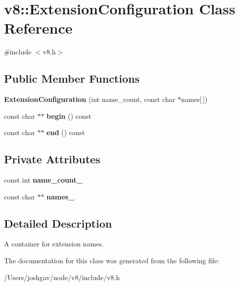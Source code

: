 \hypertarget{classv8_1_1_extension_configuration}{}\section{v8\+:\+:Extension\+Configuration Class Reference}
\label{classv8_1_1_extension_configuration}


{\ttfamily \#include $<$v8.\+h$>$}

\subsection*{Public Member Functions}
\begin{DoxyCompactItemize}
\item 
{\bfseries Extension\+Configuration} (int name\+\_\+count, const char $\ast$names\mbox{[}$\,$\mbox{]})\hypertarget{classv8_1_1_extension_configuration_a1189e46efe963db4aa7340cc767f276a}{}\label{classv8_1_1_extension_configuration_a1189e46efe963db4aa7340cc767f276a}

\item 
const char $\ast$$\ast$ {\bfseries begin} () const \hypertarget{classv8_1_1_extension_configuration_ae776fbc067a257bac854d9bcc9b72141}{}\label{classv8_1_1_extension_configuration_ae776fbc067a257bac854d9bcc9b72141}

\item 
const char $\ast$$\ast$ {\bfseries end} () const \hypertarget{classv8_1_1_extension_configuration_abcbebcc4782016f58fc60de82f59f61a}{}\label{classv8_1_1_extension_configuration_abcbebcc4782016f58fc60de82f59f61a}

\end{DoxyCompactItemize}
\subsection*{Private Attributes}
\begin{DoxyCompactItemize}
\item 
const int {\bfseries name\+\_\+count\+\_\+}\hypertarget{classv8_1_1_extension_configuration_a5cc34723570b88ea2bf3b00fae81d3cb}{}\label{classv8_1_1_extension_configuration_a5cc34723570b88ea2bf3b00fae81d3cb}

\item 
const char $\ast$$\ast$ {\bfseries names\+\_\+}\hypertarget{classv8_1_1_extension_configuration_a866e52fd6511b7dc86a0861dca114c90}{}\label{classv8_1_1_extension_configuration_a866e52fd6511b7dc86a0861dca114c90}

\end{DoxyCompactItemize}


\subsection{Detailed Description}
A container for extension names. 

The documentation for this class was generated from the following file\+:\begin{DoxyCompactItemize}
\item 
/\+Users/joshgav/node/v8/include/v8.\+h\end{DoxyCompactItemize}
